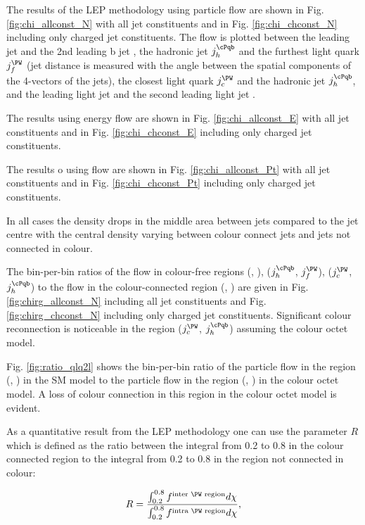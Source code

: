 The results of the LEP methodology using particle flow are shown in Fig. \ref{fig:chi_allconst_N} with all jet constituents and in Fig. \ref{fig:chi_chconst_N} including only charged jet constituents. The flow is plotted between the leading \cPqb jet \leadingb and the 2nd leading b jet \scndleadingb, the hadronic \cPqb jet $j_{h}^{\cPqb}$ and the furthest light quark $j_{f}^{\PW}$ (jet distance is measured with the angle between the spatial components of the 4-vectors of the jets), the closest light quark $j_{c}^{\PW}$ and the hadronic \cPqb jet $j_{h}^{\cPqb}$, and the leading light jet \leadingjet and the second leading light jet \scndleadingjet.

The results using energy flow are shown in Fig. \ref{fig:chi_allconst_E} with all jet constituents and in Fig. \ref{fig:chi_chconst_E} including only charged jet constituents.

The results o using \pt flow are shown in Fig. \ref{fig:chi_allconst_Pt} with all jet constituents and in Fig. \ref{fig:chi_chconst_Pt} including only charged jet constituents.

In all cases the density drops in the middle area between jets compared to the jet centre with the central density varying between colour connect jets and jets not connected in colour.

The bin-per-bin ratios of the flow in colour-free regions (\leadingb, \scndleadingb), ($j_{h}^{\cPqb}$, $j_{f}^{\PW}$), ($j_{c}^{\PW}$, $j_{h}^{\cPqb}$) to the flow in the colour-connected region (\leadingjet, \scndleadingjet) are given in Fig. \ref{fig:chirg_allconst_N} including all jet constituents and Fig. \ref{fig:chirg_chconst_N} including only charged jet constituents. Significant colour reconnection is noticeable in the region ($j_{c}^{\PW}$, $j_{h}^{\cPqb}$) assuming the colour octet \PW model.

Fig. \ref{fig:ratio_qlq2l} shows the bin-per-bin ratio of the particle flow in the region (\leadingjet, \scndleadingjet) in the SM model to the particle flow in the region (\leadingjet, \scndleadingjet) in the colour octet \PW model. A loss of colour connection in this region in the colour octet \PW model is evident.

As a quantitative result from the LEP methodology one can use the parameter $R$ which is defined as the ratio between the integral from 0.2 to 0.8 in the colour connected region to the integral from 0.2 to 0.8 in the region not connected in colour:

\begin{equation}
R=\frac{\int_{0.2}^{0.8}f^{\text{inter \PW region}}d\chi}{\int_{0.2}^{0.8}f^{\text{intra \PW region}}d\chi},
\end{equation}

